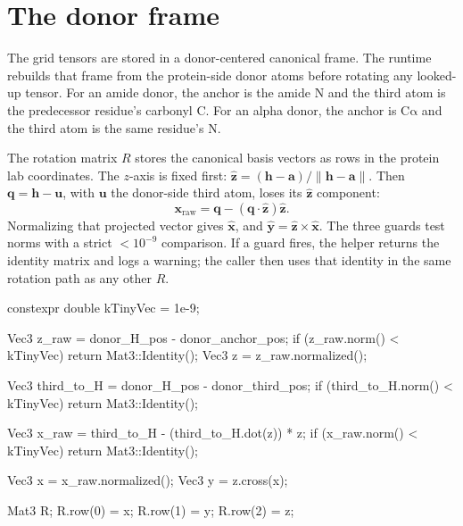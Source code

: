 \documentclass[11pt]{article}
\begin{document}
\section{The donor frame}

The grid tensors are stored in a donor-centered canonical frame. The runtime
rebuilds that frame from the protein-side donor atoms before rotating any
looked-up tensor. For an amide donor, the anchor is the amide N and the third
atom is the predecessor residue's carbonyl C. For an alpha donor, the anchor
is \(\mathrm{C\alpha}\) and the third atom is the same residue's N.

The rotation matrix \(R\) stores the canonical basis vectors as rows in the
protein lab coordinates. The \(z\)-axis is fixed first:
\(\hat{\bm z}=(\bm h-\bm a)/\|\bm h-\bm a\|\). Then
\(\bm q=\bm h-\bm u\), with \(\bm u\) the donor-side third atom, loses its
\(\hat{\bm z}\) component:
\[
  \bm x_{\mathrm{raw}} =
  \bm q - (\bm q\cdot\hat{\bm z})\hat{\bm z}.
\]
Normalizing that projected vector gives \(\hat{\bm x}\), and
\(\hat{\bm y}=\hat{\bm z}\times\hat{\bm x}\). The three guards test norms
with a strict \(<10^{-9}\) comparison. If a guard fires, the helper returns
the identity matrix and logs a warning; the caller then uses that identity in
the same rotation path as any other \(R\).

\begin{codebox}
constexpr double kTinyVec = 1e-9;

Vec3 z_raw = donor_H_pos - donor_anchor_pos;
if (z_raw.norm() < kTinyVec) return Mat3::Identity();
Vec3 z = z_raw.normalized();

Vec3 third_to_H = donor_H_pos - donor_third_pos;
if (third_to_H.norm() < kTinyVec) return Mat3::Identity();

Vec3 x_raw = third_to_H - (third_to_H.dot(z)) * z;
if (x_raw.norm() < kTinyVec) return Mat3::Identity();

Vec3 x = x_raw.normalized();
Vec3 y = z.cross(x);

Mat3 R;
R.row(0) = x;
R.row(1) = y;
R.row(2) = z;
\end{codebox}
\end{document}
